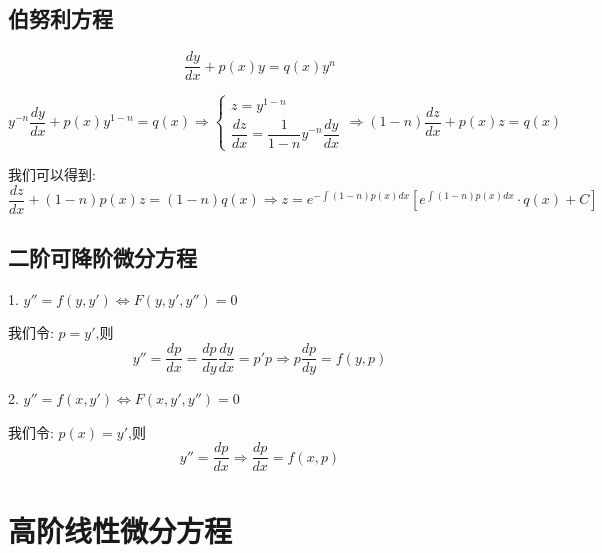 \subsection{伯努利方程}
\begin{definition}[伯努利方程]\label{def: 伯努利方程}
	$$\dfrac{dy}{dx}+p(x)y=q(x)y^{n}$$
\end{definition}
\begin{theorem}
	$$y^{-n}\dfrac{dy}{dx} +p(x)y^{1-n} = q(x)\Rightarrow
	\begin{cases}
		z = y^{1-n}\\
		\dfrac{dz}{dx} = \dfrac{1}{1-n}y^{-n}\dfrac{dy}{dx}
	\end{cases}\Rightarrow (1-n)\dfrac{dz}{dx} + p(x)z =q(x)$$

	我们可以得到: 
	$$\dfrac{dz}{dx} + (1-n)p(x)z = (1-n)q(x)\Rightarrow z = e^{-\int (1-n)p(x)dx}\left[ e^{\int (1-n)p(x)dx}\cdot q(x)+ C \right]$$
\end{theorem}

\subsection{二阶可降阶微分方程}
\begin{definition}[二阶可降阶微分方程]

	1. $y''=f(y,y')\Leftrightarrow F(y,y',y'') = 0$

	我们令:  $p=y'$,则 
	$$y''=\frac{dp}{dx}=\frac{dp}{dy}\frac{dy}{dx}=p'p \Rightarrow p\dfrac{dp}{dy} = f(y,p)$$

	2. $y''=f(x,y')\Leftrightarrow F(x,y',y'') = 0$

	我们令:  $p(x)=y'$,则
	$$y''=\frac{dp}{dx}\Rightarrow \dfrac{dp}{dx} = f(x,p)$$
\end{definition}
\section{高阶线性微分方程}
